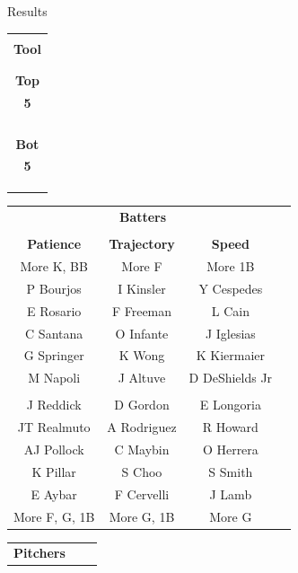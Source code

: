 \documentclass[handout]{beamer}
\begin{document}
\begin{frame}{Results}
\tiny
\hspace{-4mm}
\begin{tabular}{c}
\\\\
{\bf Tool}\\
\\\\
{\bf Top}\\
{\bf 5}\\
\\\\\\\\
{\bf Bot}\\
{\bf 5}\\
\\\\\\
\end{tabular}
\begin{tabular}{|c|c|c|c|}
\multicolumn{3}{c}{\bf\normalsize Batters}\\
\multicolumn{3}{c}{}\\
\hline
{\bf Patience}  & {\bf Trajectory}  & {\bf Speed}\\
\hline
\hline
More K, BB      & More F            & More 1B\\
\hline
P Bourjos       & I Kinsler         & Y Cespedes\\
E Rosario       & F Freeman         & L Cain\\
C Santana       & O Infante         & J Iglesias\\
G Springer      & K Wong            & K Kiermaier\\
M Napoli        & J Altuve          & D DeShields Jr\\
                &                   &\\
J Reddick       & D Gordon          & E Longoria\\
JT Realmuto     & A Rodriguez       & R Howard\\
AJ Pollock      & C Maybin          & O Herrera\\
K Pillar        & S Choo            & S Smith\\
E Aybar         & F Cervelli        & J Lamb\\
\hline
More F, G, 1B   & More G, 1B        & More G\\
\hline
\end{tabular}
\hfill
\begin{tabular}{|c|c|c|c|c|}
\multicolumn{3}{c}{\bf\normalsize Pitchers}\\

\end{tabular}
\end{frame}
\end{document}

